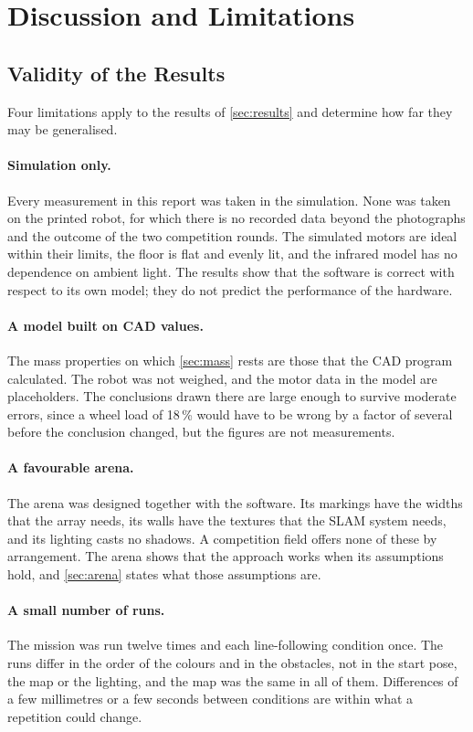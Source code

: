 \section{Discussion and Limitations}
\label{sec:discussion}

\subsection{Validity of the Results}
Four limitations apply to the results of \cref{sec:results} and determine how far they may
be generalised.

\paragraph{Simulation only.} Every measurement in this report was taken in the simulation.
None was taken on the printed robot, for which there is no recorded data beyond the
photographs and the outcome of the two competition rounds. The simulated motors are ideal
within their limits, the floor is flat and evenly lit, and the infrared model has no
dependence on ambient light. The results show that the software is correct with respect to
its own model; they do not predict the performance of the hardware.

\paragraph{A model built on CAD values.} The mass properties on which \cref{sec:mass} rests
are those that the CAD program calculated. The robot was not weighed, and the motor data in
the model are placeholders. The conclusions drawn there are large enough to survive
moderate errors, since a wheel load of 18\,\% would have to be wrong by a factor of several
before the conclusion changed, but the figures are not measurements.

\paragraph{A favourable arena.} The arena was designed together with the software. Its
markings have the widths that the array needs, its walls have the textures that the SLAM
system needs, and its lighting casts no shadows. A competition field offers none of these
by arrangement. The arena shows that the approach works when its assumptions hold, and
\cref{sec:arena} states what those assumptions are.

\paragraph{A small number of runs.} The mission was run twelve times and each line-following
condition once. The runs differ in the order of the colours and in the obstacles, not in
the start pose, the map or the lighting, and the map was the same in all of them.
Differences of a few millimetres or a few seconds between conditions are within what a
repetition could change.

